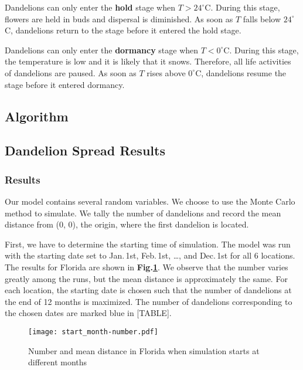 \documentclass[12pt]{article}
\begin{document}
		Dandelions can only enter the \textbf{hold} stage when $T > 24^\circ$C.  During this stage, flowers are held in buds and dispersal is diminished.  As soon as $T$ falls below $24^\circ$C, dandelions return to the stage before it entered the hold stage.  
		
		Dandelions can only enter the \textbf{dormancy} stage when $T < 0^\circ$C.  During this stage, the temperature is low and it is likely that it snows.  Therefore, all life activities of dandelions are paused.  As soon as $T$ rises above $0^\circ$C, dandelions resume the stage before it entered dormancy.
		
	\subsection{Algorithm}
	
	\subsection{Dandelion Spread Results}
	
		\subsubsection{Results}
		
			Our model contains several random variables.  We choose to use the Monte Carlo method to simulate.  We tally the number of dandelions and record the mean distance from (0, 0), the origin, where the first dandelion is located.
			
			First, we have to determine the starting time of simulation.  The model was run with the starting date set to Jan.\,1st, Feb.\,1st, \ldots, and Dec.\,1st for all 6 locations.  The results for Florida are shown in \textbf{Fig.\ref{fig:start}}.  We observe that the number varies greatly among the runs, but the mean distance is approximately the same.  For each location, the starting date is chosen such that the number of dandelions at the end of 12 months is maximized.  The number of dandelions corresponding to the chosen dates are marked blue in [TABLE].
			
			\begin{figure}[htbp]
				\centering
				\texttt{[image: start\_month-number.pdf]}
				\caption{Number and mean distance in Florida when simulation starts at different months}
				\label{fig:start}
			\end{figure}
			
\end{document}
